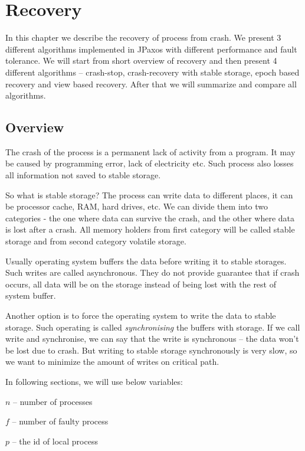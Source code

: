 \chapter{Recovery}
\label{chapter:recovery}

In this chapter we describe the recovery of process from crash. We present 3 different algorithms implemented in JPaxos with different performance and fault tolerance. We will start from short overview of recovery and then present 4 different algorithms -- crash-stop, crash-recovery with stable storage, epoch based recovery and view based recovery. After that we will summarize and compare all algorithms.

\section{Overview}

The crash of the process is a permanent lack of activity from a program. It may be caused by programming error, lack of electricity etc. Such process also losses all information not saved to stable storage.

So what is stable storage? The process can write data to different places, it can be processor cache, RAM, hard drives, etc. We can divide them into two categories - the one where data can survive the crash, and the other where data is lost after a crash. All memory holders from first category will be called stable storage and from second category volatile storage.

Usually operating system buffers the data before writing it to stable storages. Such writes are called asynchronous. They do not provide guarantee that if crash occurs, all data will be on the storage instead of being lost with the rest of system buffer.

Another option is to force the operating system to write the data to stable storage. Such operating is called \emph{synchronising} the buffers with storage. If we call write and synchronise, we can say that the write is synchronous -- the data won't be lost due to crash. But writing to stable storage synchronously is very slow, so we want to minimize the amount of writes on critical path.

In following sections, we will use below variables: 
\begin{tightList}
  \item[$n$] -- number of processes
  \item[$f$] -- number of faulty process
  \item[$p$] -- the id of local process
\end{tightList}

